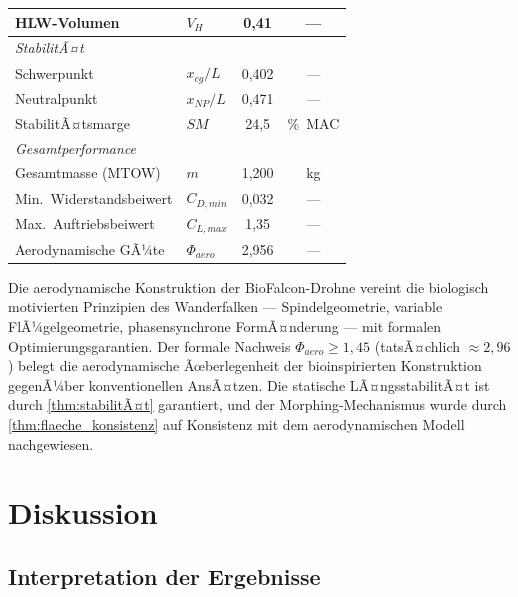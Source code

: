 ﻿\documentclass[12pt,a4paper]{article}
\theoremstyle{remark}
\begin{document}
\begin{table}[H]
\begin{tabular}{llcc}
			HLW-Volumen              & $V_H$         & 0{,}41    & ---                   \\
			\midrule
			\multicolumn{4}{l}{\textit{StabilitÃ¤t}} \\
			Schwerpunkt              & $x_{cg}/L$    & 0{,}402   & ---                   \\
			Neutralpunkt             & $x_{NP}/L$    & 0{,}471   & ---                   \\
			StabilitÃ¤tsmarge         & $SM$          & 24{,}5    & \si{\percent MAC}     \\
			\midrule
			\multicolumn{4}{l}{\textit{Gesamtperformance}} \\
			Gesamtmasse (MTOW)       & $m$           & 1{,}200   & \si{\kg}              \\
			Min.\ Widerstandsbeiwert & $C_{D,min}$   & 0{,}032   & ---                   \\
			Max.\ Auftriebsbeiwert   & $C_{L,max}$   & 1{,}35    & ---                   \\
			Aerodynamische GÃ¼te      & $\Phi_{aero}$ & 2{,}956   & ---                   \\
			\bottomrule
		\end{tabular}
	\end{table}
	
	Die aerodynamische Konstruktion der BioFalcon-Drohne vereint die biologisch
	motivierten Prinzipien des Wanderfalken --- Spindelgeometrie, variable FlÃ¼gelgeometrie,
	phasensynchrone FormÃ¤nderung --- mit formalen Optimierungsgarantien.  Der formale
	Nachweis $\Phi_{aero} \geq 1{,}45$ (tatsÃ¤chlich $\approx 2{,}96$) belegt die
	aerodynamische Ãœberlegenheit der bioinspirierten Konstruktion gegenÃ¼ber konventionellen
	AnsÃ¤tzen.  Die statische LÃ¤ngsstabilitÃ¤t ist durch \cref{thm:stabilitÃ¤t} garantiert,
	und der Morphing-Mechanismus wurde durch \cref{thm:flaeche_konsistenz} auf Konsistenz
	mit dem aerodynamischen Modell nachgewiesen.
	
	\section{Diskussion}
	
	\subsection{Interpretation der Ergebnisse}
	
\end{document}
